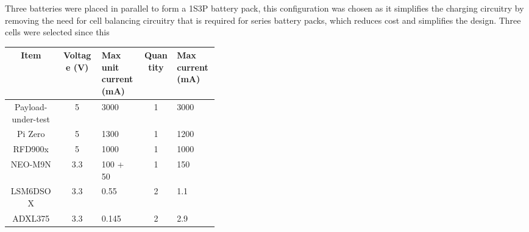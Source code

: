 \documentclass[a4paper,11pt]{article}
\begin{document}
Three batteries were placed in parallel to form a 1S3P battery pack, this configuration was chosen as it simplifies the charging circuitry by removing the need for cell balancing circuitry that is required for series battery packs, which reduces cost and simplifies the design. Three cells were selected since this %

\begin{table}[H]
  \centering
  \begin{tabular}{|c|c|p{0.2\linewidth}|c|p{0.2\linewidth}|}
    \hline
    \textbf{Item}                    & \textbf{Voltage (\si{\volt})} & \textbf{Max unit current (\si{\milli\ampere})} & \textbf{Quantity} & \textbf{Max current (\si{\milli\ampere})} \\
    \hline
    Payload-under-test               & 5                             & 3000                                           & 1                 & 3000                                      \\
    Pi Zero                          & 5                             & 1300 \cite{raspberry-pi-hardware-doc}          & 1                 & 1200                                      \\
    RFD900x                          & 5                             & 1000 \cite{rfdesign2020rfd900x}                & 1                 & 1000                                      \\
    NEO-M9N                          & 3.3                           & 100 + 50 \cite{ublox2023neo_m9n_datasheet}     & 1                 & 150                                       \\
    LSM6DSOX                         & 3.3                           & 0.55 \cite{lsm6dso-datasheet}                  & 2                 & 1.1                                       \\
    ADXL375                          & 3.3                           & 0.145 \cite{analog2014adxl375}                 & 2                 & 2.9                                       \\

\end{tabular}
\end{table}
\end{document}
